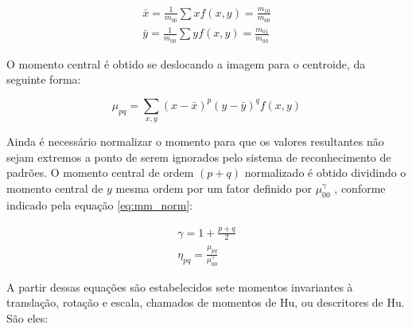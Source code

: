 \begin{subequations}\label{eq:ct_xy}
\begin{align}
    \bar{x} = \frac{1}{ m_{00} } \sum x f(x, y) = \frac{ m_{10} }{ m_{00} } \\
    \bar{y} = \frac{1}{ m_{00} } \sum y f(x, y) = \frac{ m_{01} }{ m_{00} }
\end{align}
\end{subequations}

O momento central é obtido se deslocando a imagem para o centroide,
da seguinte forma:

\begin{equation}\label{eq:mm_ctr}
\mu_{pq} = \sum_{x, y} (x - \bar{x})^p (y - \bar{y})^q f(x, y)
\end{equation}

Ainda é necessário normalizar o momento para que os valores resultantes não sejam
extremos a ponto de serem ignorados pelo sistema de reconhecimento de padrões. O
momento central de ordem $ (p+q) $ normalizado é obtido dividindo o momento
central de $ y $ mesma ordem por um fator definido por $ \mu_{00}^\gamma $ ,
conforme indicado pela equação \ref{eq:mm_norm}:

\begin{subequations}\label{eq:mm_norm}
\begin{align}
    \gamma = 1 + \frac{ p + q }{2} \\
    \eta_{pq} = \frac{ \mu_{pq} }{ \mu_{00}^\gamma }
\end{align}
\end{subequations}

A partir dessas equações são estabelecidos sete momentos invariantes à translação,
 rotação e escala, chamados de momentos de Hu, ou descritores de Hu. São eles:

